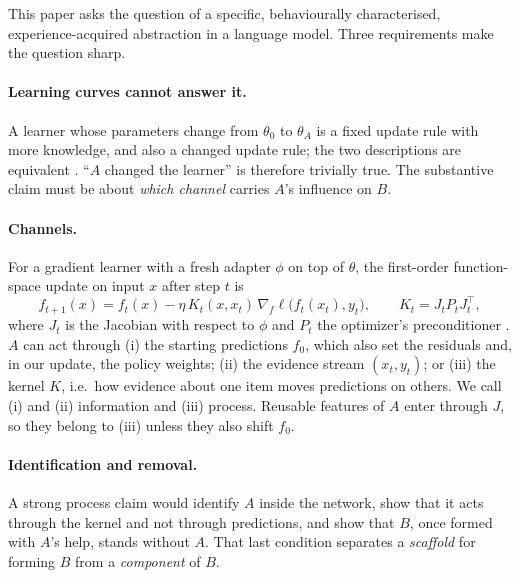 \documentclass[11pt]{article}
\begin{document}
This paper asks the question of a specific, behaviourally characterised, experience-acquired abstraction in a language model. Three requirements make the question sharp.

\paragraph{Learning curves cannot answer it.} A learner whose parameters change from $\theta_0$ to $\theta_A$ is a fixed update rule with more knowledge, and also a changed update rule; the two descriptions are equivalent \citep[cf.][]{finn2018universality}. ``$A$ changed the learner'' is therefore trivially true. The substantive claim must be about \emph{which channel} carries $A$'s influence on $B$.

\paragraph{Channels.} For a gradient learner with a fresh adapter $\phi$ on top of $\theta$, the first-order function-space update on input $x$ after step $t$ is
\begin{equation}
f_{t+1}(x) = f_t(x) - \eta\, K_t(x, x_t)\, \nabla_f \ell\big(f_t(x_t), y_t\big), \qquad K_t = J_t P_t J_t^{\top},
\end{equation}
where $J_t$ is the Jacobian with respect to $\phi$ and $P_t$ the optimizer's preconditioner \citep{jacot2018,malladi2023}. $A$ can act through (i) the starting predictions $f_0$, which also set the residuals and, in our update, the policy weights; (ii) the evidence stream $(x_t,y_t)$; or (iii) the kernel $K$, i.e.\ how evidence about one item moves predictions on others. We call (i) and (ii) information and (iii) process. Reusable features of $A$ enter through $J$, so they belong to (iii) unless they also shift $f_0$.

\paragraph{Identification and removal.} A strong process claim would identify $A$ inside the network, show that it acts through the kernel and not through predictions, and show that $B$, once formed with $A$'s help, stands without $A$. That last condition separates a \emph{scaffold} for forming $B$ from a \emph{component} of $B$.
\end{document}
